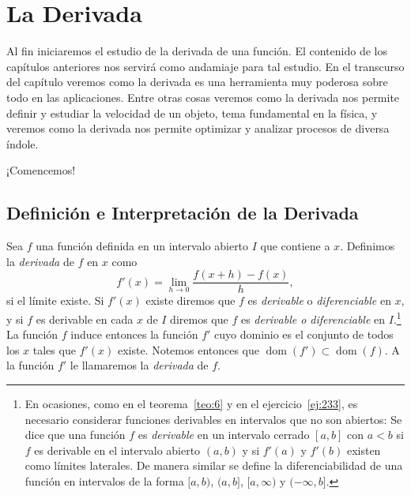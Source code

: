 \documentclass[12pt,a4paper]{book}
\DeclareMathOperator{\dom}{dom}
\begin{document}
    \chapter{La Derivada}\label{cap:derivada}

    Al fin iniciaremos el estudio de la derivada de una función. El contenido
    de los capítulos anteriores nos servirá como andamiaje para tal estudio. En
    el transcurso del capítulo veremos como la derivada es una herramienta muy
    poderosa sobre todo en las aplicaciones. Entre otras cosas veremos como
    la derivada nos permite definir y estudiar la velocidad de un objeto, tema
    fundamental en la física, y veremos como la derivada nos permite optimizar
    y analizar procesos de diversa índole.

    ¡Comencemos!

    \section{Definición e Interpretación de la Derivada}

    \begin{definicion}\label{def:44}
        Sea $f$ una función definida en
        un intervalo abierto $I$ que contiene a $x$. Definimos la \textit{derivada} de $f$ en $x$ como
        \begin{equation}\label{eq:5.1}
            f'(x)=\lim_{h\to 0}\frac{f(x+h)-f(x)}{h},
        \end{equation}
        si el límite existe. Si $f'(x)$ existe diremos que $f$ es \textit{derivable} o \textit{diferenciable} en
        $x$, y si $f$ es derivable en cada $x$ de $I$ diremos que $f$ es \textit{derivable o diferenciable}
        en $I$.\footnote{En ocasiones, como en el teorema~\ref{teo:6} y en el ejercicio~\ref{ej:233}, es necesario considerar
        funciones derivables en intervalos que no son abiertos: Se dice que una función $f$ es \textit{derivable}
        en un intervalo cerrado $[a,b]$ con $a<b$ si $f$ es derivable en el intervalo abierto $(a,b)$ y si
        $f'(a)$ y $f'(b)$ existen como límites laterales. De manera similar se define la diferenciabilidad
        de una función en intervalos de la forma $[a,b)$, $(a,b]$, $[a,\infty)$ y $(-\infty,b]$.} La función $f$ induce entonces la función $f'$ cuyo dominio es el conjunto
        de todos los $x$ tales que $f'(x)$ existe. Notemos entonces que $\dom(f')\subset
        \dom(f)$. A la función $f'$ le llamaremos la \textit{derivada} de $f$.
    \end{definicion}
\end{document}
